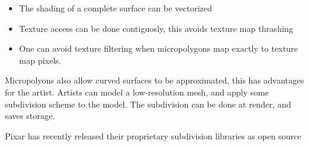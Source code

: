 \begin{itemize}
	\item The shading of a complete surface can be vectorized
	\item Texture access can be done contiguosly, this avoids texture map thrashing
	\item One can avoid texture filtering when micropolygons map exactly to texture map pixels.
\end{itemize}
	
	Micropolyons also allow curved surfaces to be approximated, this has advantages for the artist. Artists can model a low-resolution mesh, and apply some subdivision scheme to the model. The subdivision can be done at render, and saves storage.
	
	Pixar has recently released their proprietary subdivision libraries as open source \cite{pixar_subdiv}
	
	
